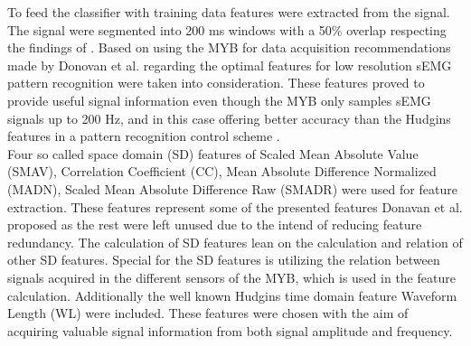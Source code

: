 	
To feed the classifier with training data features were extracted from the signal. The signal were segmented into 200 ms windows with a 50\% overlap respecting the findings of \cite{Farfan2010}. Based on using the MYB for data acquisition recommendations made by Donovan et al. \cite{Donovan2017} regarding the optimal features for low resolution sEMG pattern recognition were taken into consideration. These features proved to provide useful signal information even though the MYB only samples sEMG signals up to 200 Hz, and in this case offering better accuracy than the Hudgins features in a pattern recognition control scheme \cite{Donovan2017}. \\
Four so called space domain (SD) features of Scaled Mean Absolute Value (SMAV), Correlation Coefficient (CC), Mean Absolute Difference Normalized (MADN), Scaled Mean Absolute Difference Raw (SMADR) were used for feature extraction. These features represent some of the presented features Donavan et al. proposed as the rest were left unused due to the intend of reducing feature redundancy. The calculation of SD features lean on the calculation and relation of other SD features. Special for the SD features is utilizing the relation between signals acquired in the different sensors of the MYB, which is used in the feature calculation. Additionally the well known Hudgins time domain feature Waveform Length (WL) were included. \cite{Donovan2017} These features were chosen with the aim of acquiring valuable signal information from both signal amplitude and frequency.  
